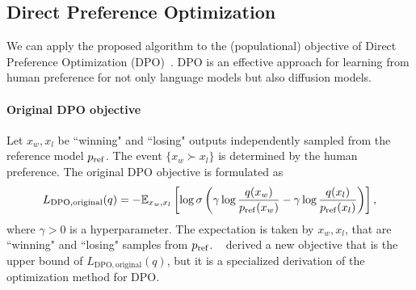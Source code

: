 
\subsection{Direct Preference Optimization}

We can apply the proposed algorithm to the (populational) objective of Direct Preference Optimization (DPO)~\citep{rafailov2023DPO}. 
DPO is an effective approach for learning from human preference for not only language models but also diffusion models.

\paragraph{Original DPO objective}
Let $x_w, x_l$ be ``winning" and ``losing" outputs independently sampled from the reference model $p_{\rm{ref}}$. The event $\lbrace x_w \succ x_l \rbrace$ is determined by the human preference. The original DPO objective is formulated as
\begin{equation}
    L_{\mathrm{DPO,original}}(q) = -\mathbb{E}_{x_w,x_l}
    \left[
        \log \sigma \left(\gamma \log \frac{q(x_w)}{p_{\rm{ref}}(x_w)}- \gamma \log \frac{q(x_l)}{p_{\rm{ref}}(x_l)}\right)
    \right],
\end{equation}
where $\gamma > 0$ is a hyperparameter.  The expectation is taken by $x_w, x_l$, that are ``winning" and ``losing" samples from $p_{\rm{ref}}$.
~\cite{Wallace2024DiffusionDPO} derived a new objective that is the upper bound of $ L_{\mathrm{DPO,original}}(q)$, but it is a specialized derivation of the optimization method for DPO.

